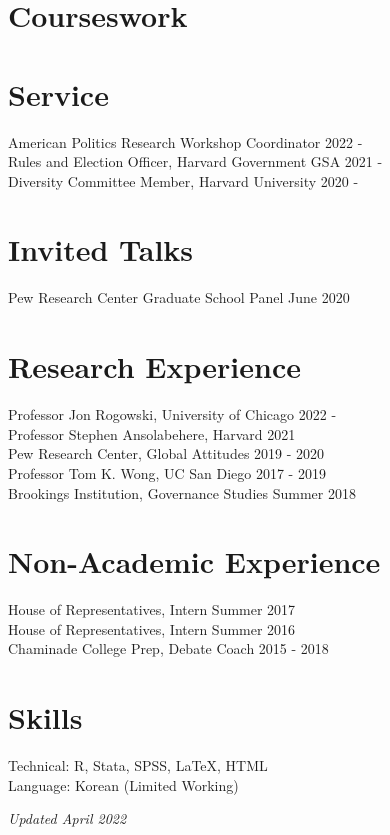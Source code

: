 \documentclass[margin, line]{res}
\begin{document}
\begin{resume}
\section{Courseswork}


\section{Service}
American Politics Research Workshop Coordinator \hfill 2022 - \\
Rules and Election Officer, Harvard Government GSA \hfill 2021 -\\
Diversity Committee Member, Harvard University \hfill 2020 -

\section{Invited Talks}
Pew Research Center Graduate School Panel \hfill June 2020

\section{Research Experience}
Professor Jon Rogowski, University of Chicago \hfill 2022 -\\
Professor Stephen Ansolabehere, Harvard \hfill 2021 \\
Pew Research Center, Global Attitudes \hfill 2019 - 2020\\
Professor Tom K. Wong, UC San Diego \hfill 2017 - 2019\\
Brookings Institution, Governance Studies \hfill Summer 2018

\section{Non-Academic Experience}
House of Representatives, Intern \hfill Summer 2017\\
House of Representatives, Intern \hfill Summer 2016\\
Chaminade College Prep, Debate Coach \hfill 2015 - 2018

\section{Skills}
Technical: R, Stata, SPSS, \LaTeX, HTML\\
Language: Korean (Limited Working)

\hfill \small{\textit{Updated April 2022}}

\end{resume}
\end{document}
